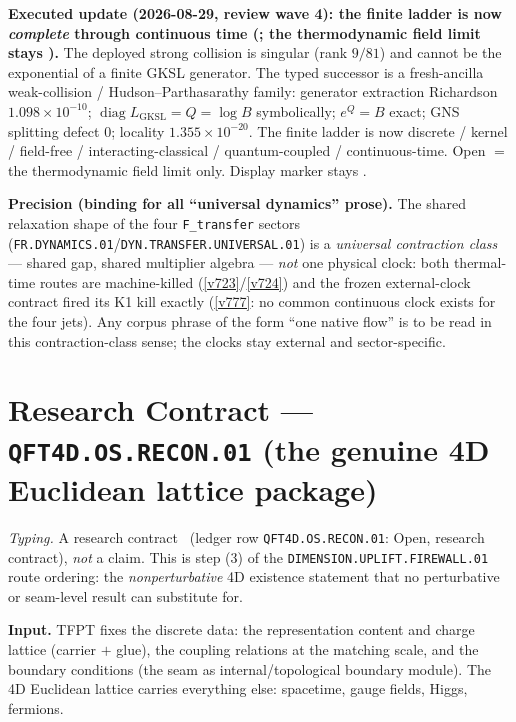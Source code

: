 \par\smallskip\noindent\textbf{Executed update (2026-08-29, review wave 4): the finite ladder
is now \emph{complete} through continuous time
(; the thermodynamic
field limit stays \mO).}
The deployed strong collision is singular (rank $9/81$) and cannot be the exponential of a
finite GKSL generator.  The typed successor is a fresh-ancilla weak-collision /
Hudson--Parthasarathy family: generator extraction Richardson $1.098\times10^{-10}$;
$\operatorname{diag}L_{\mathrm{GKSL}}=Q=\log B$ symbolically; $e^{Q}=B$ exact; GNS splitting
defect $0$; locality $1.355\times10^{-20}$.  The finite ladder is now
discrete / kernel / field-free / interacting-classical / quantum-coupled / continuous-time.
Open $=$ the thermodynamic field limit only.  Display marker stays \mO.

\par\smallskip\noindent\textbf{Precision (binding for all ``universal dynamics'' prose).}  The
shared relaxation shape of the four \texttt{F\_transfer} sectors
(\texttt{FR.DYNAMICS.01}/\texttt{DYN.TRANSFER.UNIVERSAL.01}) is a \emph{universal contraction
class} --- shared gap, shared multiplier algebra --- \emph{not} one physical clock: both
thermal-time routes are machine-killed (\vref{v723}/\vref{v724}) and the frozen external-clock
contract fired its K1 kill exactly (\vref{v777}: no common continuous clock exists for the four
jets).  Any corpus phrase of the form ``one native flow'' is to be read in this contraction-class
sense; the clocks stay external and sector-specific.

\section*{Research Contract --- \texttt{QFT4D.OS.RECON.01} (the genuine 4D Euclidean lattice package)}
\noindent\emph{Typing.} A research contract \mO\ (ledger row \texttt{QFT4D.OS.RECON.01}: Open,
research contract), \emph{not} a claim.  This is step (3) of the
\texttt{DIMENSION.UPLIFT.FIREWALL.01} route ordering: the \emph{nonperturbative} 4D existence
statement that no perturbative or seam-level result can substitute for.

\par\smallskip\noindent\textbf{Input.}  TFPT fixes the discrete data: the representation content
and charge lattice (carrier $+$ glue), the coupling relations at the matching scale, and the
boundary conditions (the seam as internal/topological boundary module).  The 4D Euclidean
lattice carries everything else: spacetime, gauge fields, Higgs, fermions.

